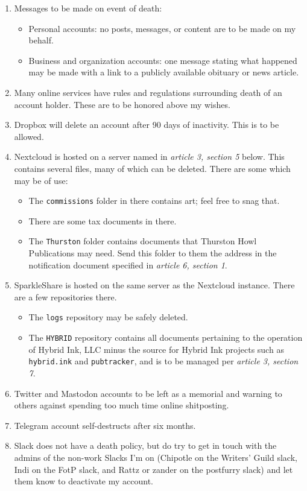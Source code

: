 \begin{enumerate}
\def\labelenumi{\arabic{enumi}.}
\tightlist
\item
  Messages to be made on event of death:

  \begin{itemize}
  \tightlist
  \item
    Personal accounts: no posts, messages, or content are to be made on my behalf.
  \item
    Business and organization accounts: one message stating what happened may be made with a link to a publicly available obituary or news article.
  \end{itemize}
\item
  Many online services have rules and regulations surrounding death of an account holder. These are to be honored above my wishes.
\item
  Dropbox will delete an account after 90 days of inactivity. This is to be allowed.
\item
  Nextcloud is hosted on a server named in \emph{article 3, section 5} below. This contains several files, many of which can be deleted. There are some which may be of use:

  \begin{itemize}
  \tightlist
  \item
    The \texttt{commissions} folder in there contains art; feel free to snag that.
  \item
    There are some tax documents in there.
  \item
    The \texttt{Thurston} folder contains documents that Thurston Howl Publications may need. Send this folder to them the address in the notification document specified in \emph{article 6, section 1}.
  \end{itemize}
\item
  SparkleShare is hosted on the same server as the Nextcloud instance. There are a few repositories there.

  \begin{itemize}
  \tightlist
  \item
    The \texttt{logs} repository may be safely deleted.
  \item
    The \texttt{HYBRID} repository contains all documents pertaining to the operation of Hybrid Ink, LLC minus the source for Hybrid Ink projects such as \texttt{hybrid.ink} and \texttt{pubtracker}, and is to be managed per \emph{article 3, section 7}.
  \end{itemize}
\item
  Twitter and Mastodon accounts to be left as a memorial and warning to others against spending too much time online shitposting.
\item
  Telegram account self-destructs after six months.
\item
  Slack does not have a death policy, but do try to get in touch with the admins of the non-work Slacks I'm on (Chipotle on the Writers' Guild slack, Indi on the FotP slack, and Rattz or zander on the postfurry slack) and let them know to deactivate my account.
\end{enumerate}

